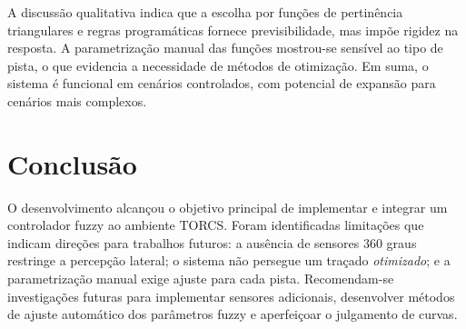 \documentclass[12pt]{article}
\begin{document}
A discuss\~ao qualitativa indica que a escolha por fun\c{c}\~oes de pertin\^encia triangulares e regras program\'aticas fornece previsibilidade, mas imp\~oe rigidez na resposta. A parametriza\c{c}\~ao manual das fun\c{c}\~oes mostrou-se sens\'ivel ao tipo de pista, o que evidencia a necessidade de m\'etodos de otimiza\c{c}\~ao. Em suma, o sistema \'e funcional em cen\'arios controlados, com potencial de expans\~ao para cen\'arios mais complexos.

\section{Conclus\~ao}
O desenvolvimento alcan\c{c}ou o objetivo principal de implementar e integrar um controlador fuzzy ao ambiente TORCS. Foram identificadas limita\c{c}\~oes que indicam dire\c{c}\~oes para trabalhos futuros: a aus\^encia de sensores 360 graus restringe a percep\c{c}\~ao lateral; o sistema n\~ao persegue um tra\c{c}ado \emph{otimizado}; e a parametriza\c{c}\~ao manual exige ajuste para cada pista. Recomendam-se investiga\c{c}\~oes futuras para implementar sensores adicionais, desenvolver m\'etodos de ajuste autom\'atico dos par\^ametros fuzzy e aperfei\c{c}oar o julgamento de curvas.



\end{document}
